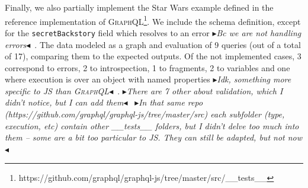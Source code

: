 \documentclass[sigplan,10pt,anonymous,review,nonacm]{acmart}
\newcommand{\mynote}[3]
    {{\color{#3} \fbox{\bfseries\sffamily\scriptsize#1}
    {\small$\blacktriangleright$\textsf{\emph{#2}}$\blacktriangleleft$}}~}
\newcommand{\et}[1]{\mynote{ET}{#1}{purple}}
\newcommand{\td}[1]{\mynote{TD}{#1}{blue}}
\newcommand{\plstyle}[1]{\mbox{\textsc{#1}}\xspace}
\newcommand{\gql}{\plstyle{GraphQL}}
\newcommand{\gcoql}{\plstyle{GraphCoQL}}
\begin{document}
Finally, we also partially implement the Star Wars example defined in the reference implementation of \gql\footnote{https://github.com/graphql/graphql-js/tree/master/src/\_\_tests\_\_}.
We include the schema definition, except for the \texttt{secretBackstory} field which resolves to an error\td{Bc we are not handling errors}. The data modeled as a graph and 
evaluation of 9 queries (out of a total of 17), comparing them to the expected outputs. Of the not implemented cases, 3 correspond to errors, 2 to introspection, 1 to fragments, 2 to variables and 
one where execution is over an object with named properties\td{Idk, something more specific to JS than \gql}.
\td{There are 7 other about validation, which I didn't notice, but I can add them}
\td{In that same repo (https://github.com/graphql/graphql-js/tree/master/src) each subfolder (type, execution, etc) contain other \_\_tests\_\_ folders, but
I didn't delve too much into them -- some are a bit too particular to JS. They can still be adapted, but not now}
		







\clearpage


\end{document}
